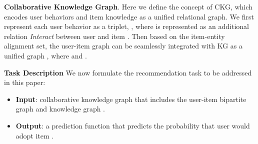 \documentclass[sigconf]{acmart}
\theoremstyle{definition}
\begin{document}
\vspace{5px}
\noindent\textbf{Collaborative Knowledge Graph}.
Here we define the concept of CKG, which encodes user behaviors and item knowledge as a unified relational graph.
We first represent each user behavior as a triplet, , where  is represented as an additional relation \emph{Interact} between user  and item .
Then based on the item-entity alignment set, the user-item graph can be seamlessly integrated with KG as a unified graph , where  and .

\vspace{5px}
\noindent\textbf{Task Description}
We now formulate the recommendation task to be addressed in this paper:
\begin{itemize}[leftmargin=*]
    \item \textbf{Input}: collaborative knowledge graph  that includes the user-item bipartite graph  and knowledge graph .
    \item \textbf{Output}: a prediction function that predicts the probability  that user  would adopt item .
\end{itemize}
\end{document}
